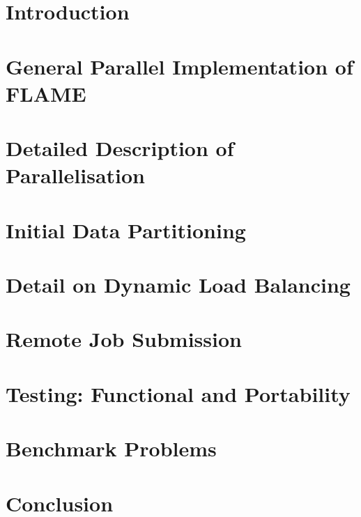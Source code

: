 \documentclass[a4paper,11pt]{article}
\begin{document}
\section{Introduction}	
\section{General Parallel Implementation of FLAME} 
\section{Detailed Description of Parallelisation} 
\section{Initial Data Partitioning} 
\section{Detail on Dynamic Load Balancing} 
\section{Remote Job Submission} 
\section{Testing: Functional and Portability} 
\section{Benchmark Problems} 
\section{Conclusion} 
\appendix 

\end{document}
